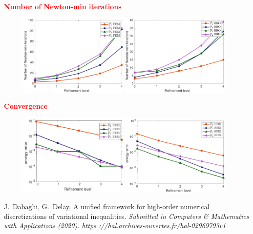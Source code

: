 \begin{frame}
  \textcolor{red}{\textbf{Number of Newton-min iterations}}
  \vspace*{0.3 cm}
  \begin{figure}
\centering
\includegraphics[width=0.48\textwidth]{number_newton_iter_FEM_2nd} \quad
\includegraphics[width=0.48\textwidth]{jump_nb_iter_Newton_HHO}
\end{figure}
  \end{frame}
\begin{frame}
  \textcolor{red}{\textbf{Convergence}}
  \vspace*{0.3 cm}
  \begin{figure}
\centering
\includegraphics[width=0.48\textwidth]{energy_error_2nd.pdf} \quad
\includegraphics[width=0.48\textwidth]{jump_energy_error_HHO}
  \end{figure}
  \begin{thebibliography}{10}
 \scriptsize{
 {\sc J.~Dabaghi, G.~Delay}, A unified framework for high-order numerical
discretizations of variational inequalities.
\em{Submitted in Computers \& Mathematics with Applications} (2020).
https ://hal.archives-ouvertes.fr/hal-02969793v1
}
 \end{thebibliography}
\end{frame}
